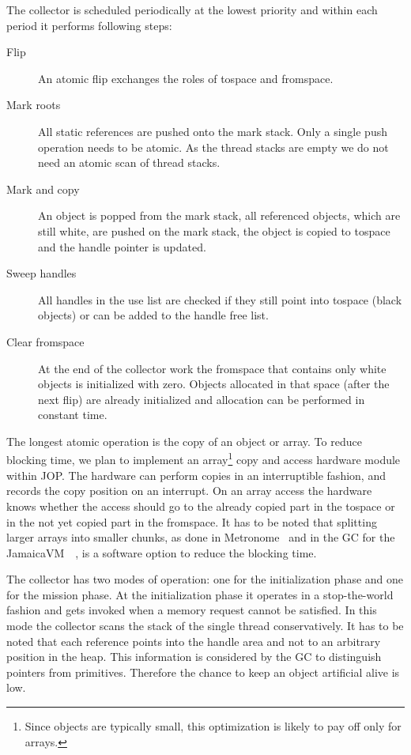 The collector is scheduled periodically at the lowest priority and
within each period it performs following steps:
\begin{description}
    \item[Flip] An atomic flip exchanges the roles of tospace and
    fromspace.
    \item[Mark roots] All static references are pushed onto the mark
    stack. Only a single push operation needs to be atomic. As the
    thread stacks are empty we do not need an atomic scan of thread
    stacks.
    \item[Mark and copy] An object is popped from the mark stack,
    all referenced objects, which are still white, are pushed on the
    mark stack, the object is copied to tospace and the handle
    pointer is updated.
    \item[Sweep handles] All handles in the use list are checked if
    they still point into tospace (black objects) or can be added to
    the handle free list.
    \item[Clear fromspace] At the end of the collector work the
    fromspace that contains only white objects is initialized with
    zero. Objects allocated in that space (after the next flip) are
    already initialized and allocation can be performed in constant
    time.
\end{description}
%
The longest atomic operation is the copy of an object or array.  To
reduce blocking time, we plan to implement an array\footnote{Since
objects are typically small, this optimization is likely to pay off
only for arrays.} copy and access hardware module within JOP. The
hardware can perform copies in an interruptible fashion, and records
the copy position on an interrupt. On an array access the hardware
knows whether the access should go to the already copied part in the
tospace or in the not yet copied part in the fromspace. It has to be
noted that splitting larger arrays into smaller chunks, as done in
Metronome~\cite{Bacon03} and in the GC for the
JamaicaVM~~\cite{gc:siebert:phd}, is a software option to reduce the
blocking time.

The collector has two modes of operation: one for the initialization
phase and one for the mission phase. At the initialization phase it
operates in a stop-the-world fashion and gets invoked when a memory
request cannot be satisfied. In this mode the collector scans the
stack of the single thread conservatively. It has to be noted that
each reference points into the handle area and not to an arbitrary
position in the heap. This information is considered by the GC to
distinguish pointers from primitives. Therefore the chance to keep
an object artificial alive is low.

